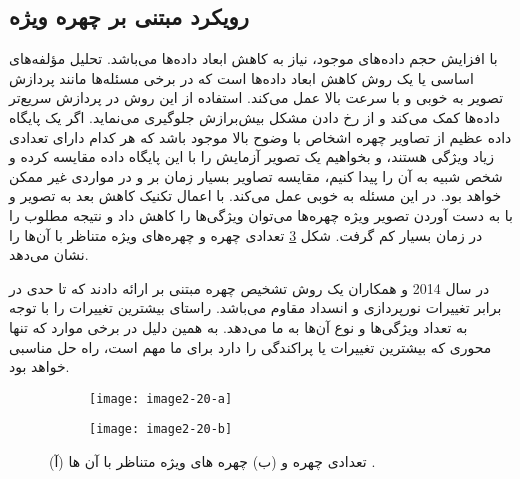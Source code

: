  \subsection{رویکرد مبتنی بر چهره ویژه}
با افزایش حجم داده‌های موجود، نیاز به کاهش ابعاد داده‌ها می‌باشد. تحلیل مؤلفه‌های اساسی یا   یک روش‌ کاهش ابعاد داده‌ها است که در برخی مسئله‌ها مانند پردازش تصویر به خوبی و با سرعت بالا عمل می‌کند. استفاده از این روش در پردازش سریع‌تر داده‌ها کمک می‌کند و از رخ دادن مشکل ‌بیش‌برازش  جلوگیری می‌نماید. اگر یک پایگاه داده عظیم از تصاویر چهره اشخاص با وضوح بالا موجود باشد که هر کدام دارای تعدادی زیاد ویژگی هستند، و بخواهیم یک تصویر آزمایش را با این پایگاه داده مقایسه کرده و شخص شبیه به آن را پیدا کنیم، مقایسه تصاویر بسیار زمان بر و در مواردی غیر ممکن خواهد بود.  در این مسئله به خوبی عمل می‌کند. با اعمال تکنیک کاهش بعد به تصویر و با به دست آوردن تصویر ویژه چهره‌ها  می‌توان ویژگی‌ها را کاهش داد و نتیجه مطلوب را در زمان بسیار کم گرفت. شکل \ref{image2-20} تعدادی چهره و چهره‌های ویژه متناظر با آن‌ها را نشان می‌دهد.

\noindent
در سال 2014  و همکاران \cite{LUAN2014495} یک روش تشخیص چهره مبتنی بر  ارائه دادند که تا حدی در برابر تغییرات نورپردازی و انسداد مقاوم می‌باشد.  راستای بیشترین تغییرات را با توجه به تعداد ویژگی‌ها و نوع آن‌ها به ما می‌دهد. به همین دلیل در برخی موارد که تنها محوری که بیشترین تغییرات یا پراکندگی را دارد برای ما مهم است، راه حل مناسبی خواهد بود. 

\begin{figure}
\begin{subfigure}{.5\textwidth}
  \centering
  \texttt{[image: image2-20-a]}
  \caption{ }
  \label{image2-20-a}
\end{subfigure}
\begin{subfigure}{.5\textwidth}
  \centering
  \texttt{[image: image2-20-b]}
  \caption{ }
  \label{image2-20-b}
\end{subfigure}
  \caption{ (آ) تعدادی چهره و (ب) چهره های ویژه متناظر با آن ها \cite{LUAN2014495}.}
\label{image2-20}
\end{figure}

